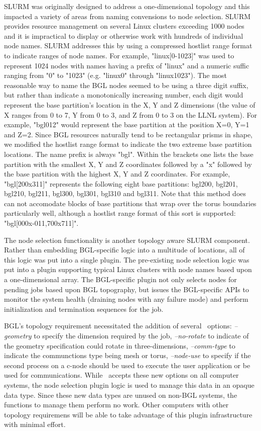 \documentclass[10pt,onecolumn,times]{../common/llncs}
\begin{document}
{SLURM was originally designed to address a one-dimensional topology
and this impacted a variety of areas from naming convensions to
node selection.
SLURM provides resource management on several Linux clusters
exceeding 1000 nodes and it is impractical to display or otherwise
work with hundreds of individual node names.
SLURM addresses this by using a compressed hostlist range format to indicate
ranges of node names.
For example, "linux[0-1023]" was used to represent 1024 nodes
with names having a prefix of "linux" and a numeric suffic ranging
from "0" to "1023" (e.g. "linux0" through "linux1023").
The most reasonable way to name the BGL nodes seemed to be
using a three digit suffix, but rather than indicate a monotonically
increasing number, each digit would represent the base partition's
location in the X, Y and Z dimensions (the value of X ranges
from 0 to 7, Y from 0 to 3, and Z from 0 to 3 on the LLNL system).
For example, "bgl012" would represent the base partition at
the position X=0, Y=1 and Z=2.
Since BGL resources naturally tend to be rectangular prisms in
shape, we modified the hostlist range format to indicate the two
extreme base partition locations.
The name prefix is always "bgl".
Within the brackets one lists the base partition with the smallest
X, Y and Z coordinates followed by a "x" followed by the base
partition with the highest X, Y and Z coordinates.
For example, "bgl[200x311]" represents the following eight base
partitions: bgl200, bgl201, bgl210, bgl211, bgl300, bgl301, bgl310
and bgl311.
Note that this method does can not accomodate blocks of base
partitions that wrap over the torus boundaries particularly well,
although a hostlist range format of this sort is supported:
"bgl[000x-011,700x711]".

The node selection functionality is another topology aware
SLURM component.
Rather than embedding BGL-specific logic into a multitude of
locations, all of this logic was put into a single plugin.
The pre-existing node selection logic was put into a plugin
supporting typical Linux clusters with node names based
upon a one-dimensional array.
The BGL-specific plugin not only selects nodes for pending jobs
based upon BGL topography, but issues the BGL-specific APIs
to monitor the system health (draining nodes with any failure
mode) and perform initialization and termination sequences for the job.

BGL's topology requirement necessitated the addition of several
\srun\ options: {\em --geometry} to specify the dimension required by
the job,
 {\em --no-rotate} to indicate of the geometry specification could rotate
in three-dimensions,
{\em --comm-type} to indicate the communctions type being mesh or torus,
{\em --node-use} to specify if the second process on a c-node should
be used to execute the user application or be used for communications.
While \srun\ accepts these new options on all computer systems,
the node selection plugin logic is used to manage this data in an
opaque data type.
Since these new data types are unused on non-BGL systems, the
functions to manage them perform no work.
Other computers with other topology requiremens will be able to
take advantage of this plugin infrastructure with minimal effort.

}
\end{document}
